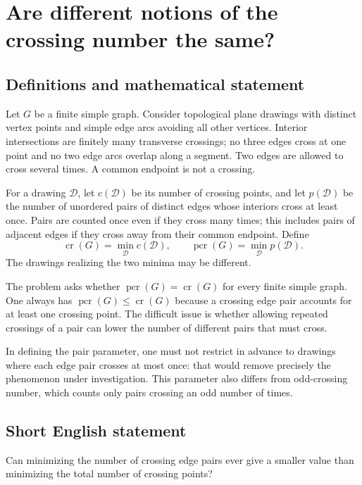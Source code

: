\documentclass[11pt,a4paper]{article}
\begin{document}
\section*{Are different notions of the crossing number the same?}\label{statement}

\subsection{Definitions and mathematical statement}
Let $G$ be a finite simple graph. Consider topological plane drawings
with distinct vertex points and simple edge arcs avoiding all other
vertices. Interior intersections are finitely many transverse
crossings; no three edges cross at one point and no two edge arcs
overlap along a segment. Two edges are allowed to cross several
times. A common endpoint is not a crossing.

For a drawing $\mathcal D$, let $c(\mathcal D)$ be its number of
crossing points, and let $p(\mathcal D)$ be the number of unordered
pairs of distinct edges whose interiors cross at least once. Pairs
are counted once even if they cross many times; this includes pairs
of adjacent edges if they cross away from their common endpoint.
Define
\[
 \operatorname{cr}(G)=\min_{\mathcal D}c(\mathcal D),
 \qquad
 \operatorname{pcr}(G)=\min_{\mathcal D}p(\mathcal D).
\]
The drawings realizing the two minima may be different.

The problem asks whether $\operatorname{pcr}(G)=\operatorname{cr}(G)$
for every finite simple graph. One always has
$\operatorname{pcr}(G)\le\operatorname{cr}(G)$ because a crossing edge
pair accounts for at least one crossing point. The difficult issue
is whether allowing repeated crossings of a pair can lower the
number of different pairs that must cross.

In defining the pair parameter, one must not restrict in advance
to drawings where each edge pair crosses at most once: that would
remove precisely the phenomenon under investigation. This parameter
also differs from odd-crossing number, which counts only pairs
crossing an odd number of times.
\subsection{Short English statement}
Can minimizing the number of crossing edge pairs ever give a smaller value than minimizing the total number of crossing points?
\end{document}
